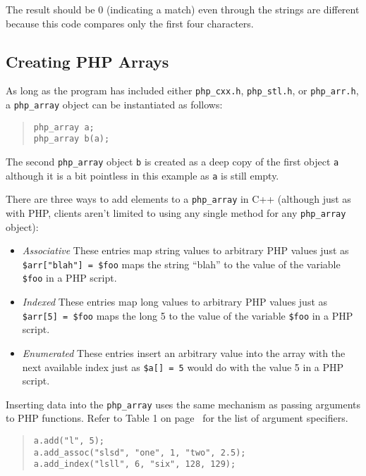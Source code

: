 \documentclass[11pt,titlepage]{article}
\begin{document}
The result should be 0 (indicating a match) even through the strings are different because this code compares only the first four characters.

\subsection{Creating PHP Arrays}

As long as the program has included either \verb|php_cxx.h|, \verb|php_stl.h|, or \verb|php_arr.h|, a \verb|php_array| object can be instantiated as follows:

\begin{quote}
\begin{verbatim}
php_array a;
php_array b(a);
\end{verbatim}
\end{quote}

The second \verb|php_array| object \verb|b| is created as a deep copy of the first object \verb|a| although it is a bit pointless in this example as \verb|a| is still empty.

There are three ways to add elements to a \verb|php_array| in C++ (although just as with PHP, clients aren't limited to using any single method for any \verb|php_array| object):

\begin{itemize}
\item \emph{Associative} These entries map string values to arbitrary PHP values just as \verb|$arr["blah"] = $foo| maps the string ``blah'' to the value of the variable \verb|$foo| in a PHP script. 
\item \emph{Indexed} These entries map long values to arbitrary PHP values just as \verb|$arr[5] = $foo| maps the long 5 to the value of the variable \verb|$foo| in a PHP script.
\item \emph{Enumerated} These entries insert an arbitrary value into the array with the next available index just as \verb|$a[] = 5| would do with the value 5 in a PHP script.
\end{itemize}

Inserting data into the \verb|php_array| uses the same mechanism as passing arguments to PHP functions. Refer to Table 1 on page~\pageref{Table1} for the list of argument specifiers. 

\begin{quote}
\begin{verbatim}
a.add("l", 5);
a.add_assoc("slsd", "one", 1, "two", 2.5);
a.add_index("lsll", 6, "six", 128, 129);
\end{verbatim}
\end{quote}
\end{document}
